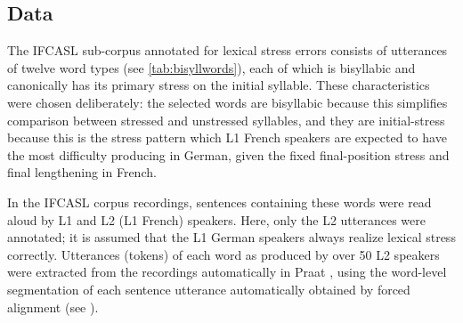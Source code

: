 	
	\subsection{Data}
	
	The IFCASL sub-corpus annotated for lexical stress errors consists of utterances of twelve word types (see \cref{tab:bisyllwords}), each of which is bisyllabic and canonically has its primary stress on the initial syllable. These characteristics were chosen deliberately: the selected words are bisyllabic because this simplifies comparison between stressed and unstressed syllables, and they are initial-stress because this is the stress pattern which L1 French speakers are expected to have the most difficulty producing in German, given the fixed final-position stress and final lengthening in French.
	
	In the IFCASL corpus recordings, sentences containing these words were read aloud by L1 and L2 (L1 French) speakers. Here, only the L2 utterances were annotated; it is assumed that the L1 German speakers always realize lexical stress correctly. 
	Utterances (tokens) of each word as produced by over 50 L2 speakers were extracted from the recordings automatically in Praat \parencite{Boersma2014}, using the word-level segmentation of each sentence utterance automatically obtained by forced alignment (see ).
	
